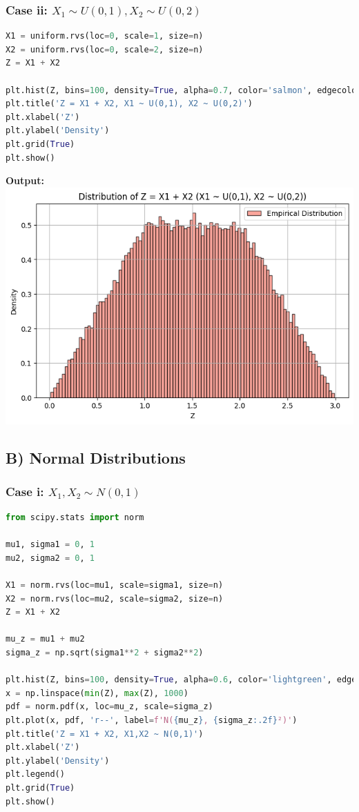 \documentclass[12pt]{article}
\begin{document}
\subsubsection*{Case ii: \( X_1 \sim U(0,1), X_2 \sim U(0,2) \)}
\begin{lstlisting}[language=Python]
X1 = uniform.rvs(loc=0, scale=1, size=n)
X2 = uniform.rvs(loc=0, scale=2, size=n)
Z = X1 + X2

plt.hist(Z, bins=100, density=True, alpha=0.7, color='salmon', edgecolor='black')
plt.title('Z = X1 + X2, X1 ~ U(0,1), X2 ~ U(0,2)')
plt.xlabel('Z')
plt.ylabel('Density')
plt.grid(True)
plt.show()
\end{lstlisting}

\textbf{Output:} \\
\includegraphics[width=0.8\linewidth]{uniform_0_2.png}

\newpage
\subsection*{B) Normal Distributions}

\subsubsection*{Case i: \( X_1, X_2 \sim N(0,1) \)}
\begin{lstlisting}[language=Python]
from scipy.stats import norm

mu1, sigma1 = 0, 1
mu2, sigma2 = 0, 1

X1 = norm.rvs(loc=mu1, scale=sigma1, size=n)
X2 = norm.rvs(loc=mu2, scale=sigma2, size=n)
Z = X1 + X2

mu_z = mu1 + mu2
sigma_z = np.sqrt(sigma1**2 + sigma2**2)

plt.hist(Z, bins=100, density=True, alpha=0.6, color='lightgreen', edgecolor='black')
x = np.linspace(min(Z), max(Z), 1000)
pdf = norm.pdf(x, loc=mu_z, scale=sigma_z)
plt.plot(x, pdf, 'r--', label=f'N({mu_z}, {sigma_z:.2f}²)')
plt.title('Z = X1 + X2, X1,X2 ~ N(0,1)')
plt.xlabel('Z')
plt.ylabel('Density')
plt.legend()
plt.grid(True)
plt.show()
\end{lstlisting}
\end{document}
